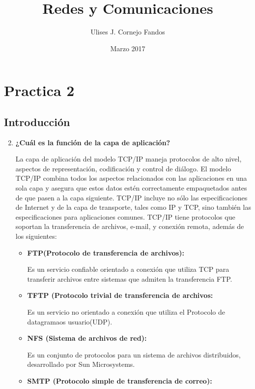 \documentclass[a4paper,10pt]{article}
\title{Redes y Comunicaciones}
\author{Ulises J. Cornejo Fandos}
\date{Marzo 2017}
\begin{document}
\maketitle

\section{Practica 2}
\subsection{Introducción}
\begin{enumerate}
    \setcounter{enumi}{1}
    \item \textbf{¿Cuál es la función de la capa de aplicación?}
    
    La capa de aplicación del modelo TCP/IP maneja protocolos de alto nivel, aspectos de representación, codificación y control de diálogo. El modelo TCP/IP combina todos los aspectos relacionados con las aplicaciones en una sola capa y asegura que estos datos estén correctamente empaquetados antes de que pasen a la capa siguiente. TCP/IP incluye no sólo las especificaciones de Internet y de la capa de transporte, tales como IP y TCP, sino también las especificaciones para aplicaciones comunes. TCP/IP tiene protocolos que soportan la transferencia de archivos, e-mail, y conexión remota, además de los siguientes:
        \begin{itemize}
            \item \textbf{FTP(Protocolo de transferencia de archivos):}
            
            Es un servicio confiable orientado a conexión que utiliza TCP para transferir archivos entre sistemas que admiten la transferencia FTP.
            
            \item \textbf{TFTP (Protocolo trivial de transferencia de archivos:}
            
            Es un servicio no orientado a conexión que utiliza el Protocolo de datagramaos   usuario(UDP).
            
            \item \textbf{NFS (Sistema de archivos de red):}
            
            Es un conjunto de protocolos para un sistema de archivos distribuidos, desarrollado por Sun Microsystems.
            
            \item \textbf{SMTP (Protocolo simple de transferencia de correo):} 
            

\end{itemize}
\end{enumerate}
\end{document}
